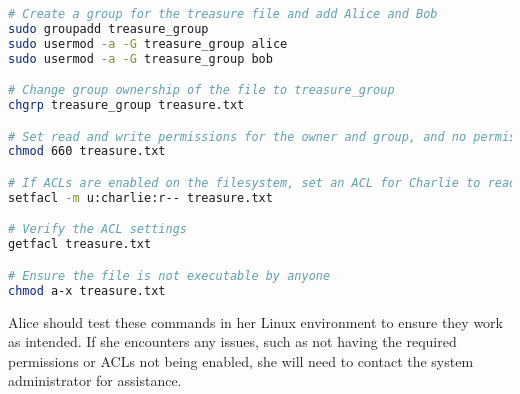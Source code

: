 \documentclass{article}
\begin{document}
\begin{lstlisting}[language=bash]
# Create a group for the treasure file and add Alice and Bob
sudo groupadd treasure_group
sudo usermod -a -G treasure_group alice
sudo usermod -a -G treasure_group bob

# Change group ownership of the file to treasure_group
chgrp treasure_group treasure.txt

# Set read and write permissions for the owner and group, and no permissions for others
chmod 660 treasure.txt

# If ACLs are enabled on the filesystem, set an ACL for Charlie to read
setfacl -m u:charlie:r-- treasure.txt

# Verify the ACL settings
getfacl treasure.txt

# Ensure the file is not executable by anyone
chmod a-x treasure.txt
\end{lstlisting}

Alice should test these commands in her Linux environment to ensure they work as intended. If she encounters any issues, such as not having the required permissions or ACLs not being enabled, she will need to contact the system administrator for assistance.
\end{document}
